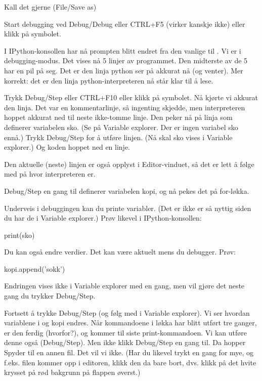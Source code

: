 {Kall det gjerne  (File/Save as)

Start debugging ved Debug/Debug eller CTRL+F5 (virker kanskje ikke) eller klikk på symbolet.

I IPython-konsollen har nå prompten blitt endret fra den vanlige  til . Vi er i debugging-modus.  Det vises nå 5 linjer av programmet. Den midterste av de 5 har en pil på seg. Det er den linja python ser på akkurat nå (og venter). Mer korrekt: det er den linja python-interpreteren nå står klar til å lese.

Trykk Debug/Step eller CTRL+F10 eller klikk på symbolet. Nå kjørte vi akkurat den linja. Det var en kommentarlinje, så ingenting skjedde, men interpreteren hoppet akkurat ned til neste ikke-tomme linje. Den peker nå på linja som definerer variabelen sko. (Se på Variable explorer. Der er ingen variabel sko ennå.) Trykk Debug/Step for å utføre linjen. (Nå skal sko vises i Variable explorer.) Og koden hoppet ned en linje.

Den aktuelle (neste) linjen er også opplyst i Editor-vinduet, så det er lett å følge med på hvor interpreteren er. 

Debug/Step en gang til definerer variabelen kopi, og nå pekes det på for-løkka.

Underveis i debuggingen kan du printe variabler. (Det er ikke er så nyttig siden du har de i Variable explorer.) Prøv likevel i IPython-konsollen:
\begin{usncodebox}
print(sko)
\end{usncodebox}

Du kan også endre verdier. Det kan være aktuelt mens du debugger. Prøv:
\begin{usncodebox}
kopi.append('sokk')
\end{usncodebox}

Endringen vises ikke i Variable explorer med en gang, men vil gjøre det neste gang du trykker Debug/Step. 

Fortsett å trykke Debug/Step (og følg med i Variable explorer). Vi ser hvordan variablene i og kopi endres. Når kommandoene i løkka har blitt utført tre ganger, er den ferdig (hvorfor?), og kommer til siste print-kommandoen. Vi kan utføre denne også (Debug/Step). Men ikke klikk Debug/Step en gang til. Da hopper Spyder til en annen fil. Det vil vi ikke. (Har du likevel trykt en gang for mye, og f.eks. filen  kommer opp i editoren, klikk den da bare bort, dvs. klikk på det hvite krysset på rød bakgrunn på flappen øverst.)

}
